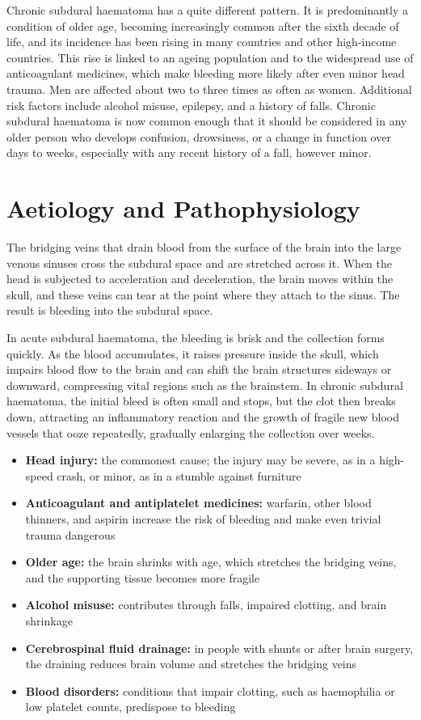 Chronic subdural haematoma has a quite different pattern. It is predominantly a condition of older age, becoming increasingly common after the sixth decade of life, and its incidence has been rising in many countries and other high-income countries. This rise is linked to an ageing population and to the widespread use of anticoagulant medicines, which make bleeding more likely after even minor head trauma. Men are affected about two to three times as often as women. Additional risk factors include alcohol misuse, epilepsy, and a history of falls. Chronic subdural haematoma is now common enough that it should be considered in any older person who develops confusion, drowsiness, or a change in function over days to weeks, especially with any recent history of a fall, however minor.

\section*{Aetiology and Pathophysiology}
The bridging veins that drain blood from the surface of the brain into the large venous sinuses cross the subdural space and are stretched across it. When the head is subjected to acceleration and deceleration, the brain moves within the skull, and these veins can tear at the point where they attach to the sinus. The result is bleeding into the subdural space.

In acute subdural haematoma, the bleeding is brisk and the collection forms quickly. As the blood accumulates, it raises pressure inside the skull, which impairs blood flow to the brain and can shift the brain structures sideways or downward, compressing vital regions such as the brainstem. In chronic subdural haematoma, the initial bleed is often small and stops, but the clot then breaks down, attracting an inflammatory reaction and the growth of fragile new blood vessels that ooze repeatedly, gradually enlarging the collection over weeks.

\begin{itemize}
    \item \textbf{Head injury:} the commonest cause; the injury may be severe, as in a high-speed crash, or minor, as in a stumble against furniture
    \item \textbf{Anticoagulant and antiplatelet medicines:} warfarin, other blood thinners, and aspirin increase the risk of bleeding and make even trivial trauma dangerous
    \item \textbf{Older age:} the brain shrinks with age, which stretches the bridging veins, and the supporting tissue becomes more fragile
    \item \textbf{Alcohol misuse:} contributes through falls, impaired clotting, and brain shrinkage
    \item \textbf{Cerebrospinal fluid drainage:} in people with shunts or after brain surgery, the draining reduces brain volume and stretches the bridging veins
    \item \textbf{Blood disorders:} conditions that impair clotting, such as haemophilia or low platelet counts, predispose to bleeding
\end{itemize}

